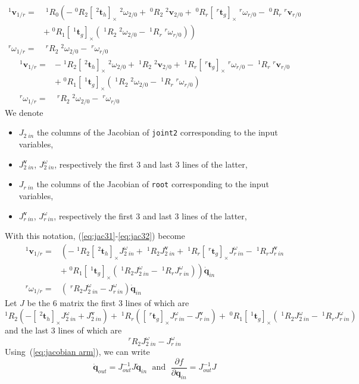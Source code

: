 \documentclass{article}
\newcommand\linvel{\mathbf{v}}
\newcommand\trans{\mathbf{t}}
\newcommand\conf{\mathbf{q}}
\begin{document}
\begin{align*}
  ^1\linvel_{1/r} =& \;^1R_0\left(
  -\;^0R_2[\;^2\trans_h]_{\times}\;^2\omega_{2/0} + \;^0R_2\;^2\linvel_{2/0}
  +\;^0R_r[\;^r\trans_g]_{\times}\;^r\omega_{r/0} - \;^0R_r\;^r\linvel_{r/0} \right.\\
  &\left.+\;^0R_1[\;^1\trans_g]_{\times} (\;^1R_2\;^2\omega_{2/0} - \;^1R_{r}\;^r\omega_{r/0})  \right)\\
  ^r\omega_{1/r} =& \;^rR_2\;^2\omega_{2/0} - \;^r\omega_{r/0}
\end{align*}
\begin{align}
  ^1\linvel_{1/r} =&
  -\;^1R_2[\;^2\trans_h]_{\times}\;^2\omega_{2/0} + \;^1R_2\;^2\linvel_{2/0}
  +\;^1R_r[\;^r\trans_g]_{\times}\;^r\omega_{r/0} - \;^1R_r\;^r\linvel_{r/0}\\
  \label{eq:jac31}
  &+\;^0R_1[\;^1\trans_g]_{\times} (\;^1R_2\;^2\omega_{2/0} - \;^1R_{r}\;^r\omega_{r/0})\\
  \label{eq:jac32}
  ^r\omega_{1/r} =& \;^rR_2\;^2\omega_{2/0} - \;^r\omega_{r/0}
\end{align}
We denote
\begin{itemize}
\item $J_{2\;in}$ the columns of the Jacobian of \texttt{joint2} corresponding to the input variables,
\item $J_{2\;in}^{\linvel}$, $J_{2\;in}^{\omega}$, respectively the first 3 and last 3 lines of the latter,
\item $J_{r\;in}$ the columns of the Jacobian of \texttt{root} corresponding to the input variables,
\item $J_{r\;in}^{\linvel}$, $J_{r\;in}^{\omega}$, respectively the first 3 and last 3 lines of the latter,
\end{itemize}
With this notation, (\ref{eq:jac31}-\ref{eq:jac32}) become
\begin{align*}
  ^1\linvel_{1/r} =&
  \left(-\;^1R_2[\;^2\trans_h]_{\times}J_{2\;in}^{\omega} + \;^1R_2J_{2\;in}^{\linvel}
  +\;^1R_r[\;^r\trans_g]_{\times}J_{r\;in}^{\omega} - \;^1R_rJ_{r\;in}^{\linvel}\right.\\
  &\left.+\;^0R_1[\;^1\trans_g]_{\times} (\;^1R_2J_{2\;in}^{\omega} - \;^1R_{r}J_{r\;in}^{\omega})\right)\dot{\conf}_{in}\\
  ^r\omega_{1/r} =& \left(\;^rR_2J_{2\;in}^{\omega} - J_{r\;in}^{\omega}\right)\dot{\conf}_{in}
\end{align*}
Let $J$ be the 6 matrix the first 3 lines of which are
$$
^1R_2(-[\;^2\trans_h]_{\times}J_{2\;in}^{\omega} + J_{2\;in}^{\linvel})
+\;^1R_r([\;^r\trans_g]_{\times}J_{r\;in}^{\omega} - J_{r\;in}^{\linvel}) + \;^0R_1[\;^1\trans_g]_{\times} (\;^1R_2J_{2\;in}^{\omega} - \;^1R_{r}J_{r\;in}^{\omega})
$$
and the last 3 lines of which are
$$
^rR_2J_{2\;in}^{\omega} - J_{r\;in}^{\omega}
$$
Using~(\ref{eq:jacobian arm}), we can write
$$
\dot{\conf}_{out} = J_{out}^{-1}J \dot{\conf}_{in} \;\mbox{ and }\; \frac{\partial f}{\partial \conf_{in}} = J_{out}^{-1}J
$$


\end{document}
